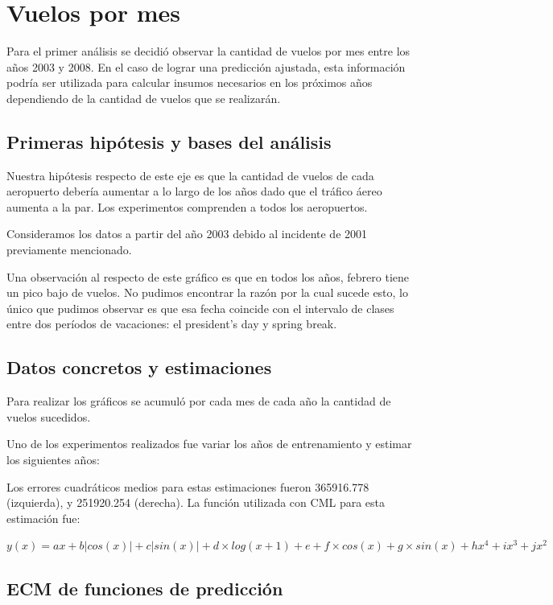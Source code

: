 \section{Vuelos por mes}

Para el primer análisis se decidió observar la cantidad de vuelos por mes entre los años 2003 y 2008. En el caso de lograr una predicción ajustada, esta información podría ser utilizada para calcular insumos necesarios en los próximos años dependiendo de la cantidad de vuelos que se realizarán.

\subsection{Primeras hipótesis y bases del análisis}

Nuestra hipótesis respecto de este eje es que la cantidad de vuelos de cada aeropuerto debería aumentar a lo largo de los años dado que el tráfico áereo aumenta a la par. Los experimentos comprenden a todos los aeropuertos.

Consideramos los datos a partir del año 2003 debido al incidente de 2001 previamente mencionado.

Una observación al respecto de este gráfico es que en todos los años, febrero tiene un pico bajo de vuelos. No pudimos encontrar la razón por la cual sucede esto, lo único que pudimos observar es que esa fecha coincide con el intervalo de clases entre dos períodos de vacaciones: el president’s day y spring break.

\subsection{Datos concretos y estimaciones}

Para realizar los gráficos se acumuló por cada mes de cada año la cantidad de vuelos sucedidos.

Uno de los experimentos realizados fue variar los años de entrenamiento y estimar los siguientes años:

Los errores cuadráticos medios para estas estimaciones fueron 365916.778 (izquierda), y 251920.254 (derecha). La función utilizada con CML para esta estimación fue:

\bigskip

$y(x) = ax + b|cos(x)| + c|sin(x)| + d \times log(x+1) + e + f \times cos(x) + g \times sin(x) + hx^4 + ix^3 + jx^2$

\subsection{ECM de funciones de predicción}

